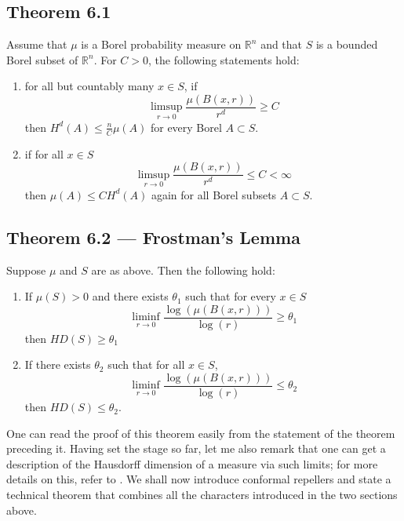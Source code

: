 \documentclass[11pt,a4paper]{article}
\begin{document}
\subsection*{Theorem 6.1}
    Assume that $\mu$ is a Borel probability measure on $\mathbb{R}^n$ and
    that $S$ is a bounded Borel subset of $\mathbb{R}^n$. For $C>0$, the
    following statements hold:
    \begin{enumerate}
        \item for all but countably many $x\in S$, if
        $$\limsup_{r\rightarrow 0} \frac{\mu(B(x, r))}{r^d} \geq C$$
        then $H^d(A) \leq \frac{n}{C}\mu(A)$ for every Borel $A \subset S$.
        \item if for all $x\in S$
        $$\limsup_{r\rightarrow 0} \frac{\mu(B(x, r))}{r^d} \leq C < \infty$$
        then $\mu(A) \leq CH^d(A)$ again for all Borel subsets $A \subset S$.
    \end{enumerate}

\subsection*{Theorem 6.2 — Frostman's Lemma}
    Suppose $\mu$ and $S$ are as above. Then the following hold:
    \begin{enumerate}
        \item If $\mu(S)>0$ and there exists $\theta_1$ such that for every $x\in S$
        $$\liminf_{r\rightarrow 0} \frac{\log(\mu(B(x, r)))}{\log(r)}\geq \theta_1$$
        then $HD(S) \geq \theta_1$
        \item If there exists $\theta_2$ such that for all $x\in S$,
        $$\liminf_{r\rightarrow 0} \frac{\log(\mu(B(x, r)))}{\log(r)} \leq \theta_2$$
        then $HD(S) \leq \theta_2$.
    \end{enumerate}


One can read the proof of this theorem easily from the statement of the
theorem preceding it. Having set the stage so far, let me also remark that one
can get a description of the Hausdorff dimension of a measure via such limits;
for more details on this, refer to \cite{falconer2004fractal}. We shall now
introduce conformal repellers and state a technical theorem that combines all
the characters introduced in the two sections above.

\end{document}
